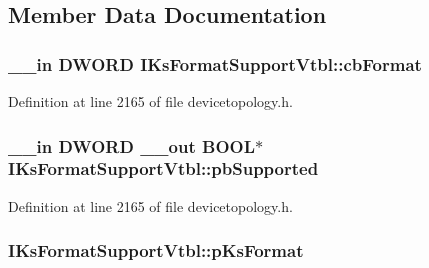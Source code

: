 \subsection{Member Data Documentation}
\subsubsection[{\texorpdfstring{cb\+Format}{cbFormat}}]{ {\bf \+\_\+\+\_\+in} {\bf D\+W\+O\+RD} I\+Ks\+Format\+Support\+Vtbl\+::cb\+Format}\hypertarget{struct_i_ks_format_support_vtbl_a5f4f0d8c43069d4bc3df1ef90afd2a52}{}\label{struct_i_ks_format_support_vtbl_a5f4f0d8c43069d4bc3df1ef90afd2a52}


Definition at line 2165 of file devicetopology.\+h.

\subsubsection[{\texorpdfstring{pb\+Supported}{pbSupported}}]{ {\bf \+\_\+\+\_\+in} {\bf D\+W\+O\+RD} {\bf \+\_\+\+\_\+out} {\bf B\+O\+OL}$\ast$ I\+Ks\+Format\+Support\+Vtbl\+::pb\+Supported}\hypertarget{struct_i_ks_format_support_vtbl_af67651ffc8672c13eb9b8c282a8a768c}{}\label{struct_i_ks_format_support_vtbl_af67651ffc8672c13eb9b8c282a8a768c}


Definition at line 2165 of file devicetopology.\+h.

\subsubsection[{\texorpdfstring{p\+Ks\+Format}{pKsFormat}}]{ I\+Ks\+Format\+Support\+Vtbl\+::p\+Ks\+Format}\hypertarget{struct_i_ks_format_support_vtbl_a640d33f8f91ba33767ec8e6b6260e6b9}{}\label{struct_i_ks_format_support_vtbl_a640d33f8f91ba33767ec8e6b6260e6b9}


